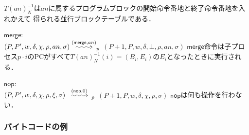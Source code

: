 \documentclass[submit,PRO]{ipsj}
\makeatletter
\newcommand{\longsquiggly}{\xymatrix{{}\ar@{~>}[r]&{}}}
\newcommand{\bcode}[1]{$\mathsf{#1}$}
\newcommand{\brightarrow}[1]{\stackrel{#1}{\longsquiggly}}
\makeatother
\begin{document}
\begin{list}
$T(an)^{-1}_N$は$an$に属するプログラムブロックの開始命令番地と終了命令番地を入れかえて
得られる並行ブロックテーブルである．
\item \bcode{merge}:\\
$(P,P',w,\delta,\chi,\rho,an,\sigma)\brightarrow{(\mathsf{merge},an)}_p$\newline
\qquad $(P+1,P,w,\delta,\bot,\rho,an,\sigma)$\newline
\bcode{merge}命令は子プロセス$p\cdot i$のPCがすべて$T(an)^{-1}_N(i)=(B_i,E_i)$の$E_i$となったときに実行される．
\item \bcode{nop}:\\
$(P,P',w,\delta,\chi,\rho,\xi,\sigma)\brightarrow{(\mathsf{nop},0)}_p$\newline
\qquad $(P+1,P,w,\delta,\chi,\rho,\sigma)$\newline
\bcode{nop}は何も操作を行わない．

\end{list}

\subsubsection{バイトコードの例}
\end{document}
